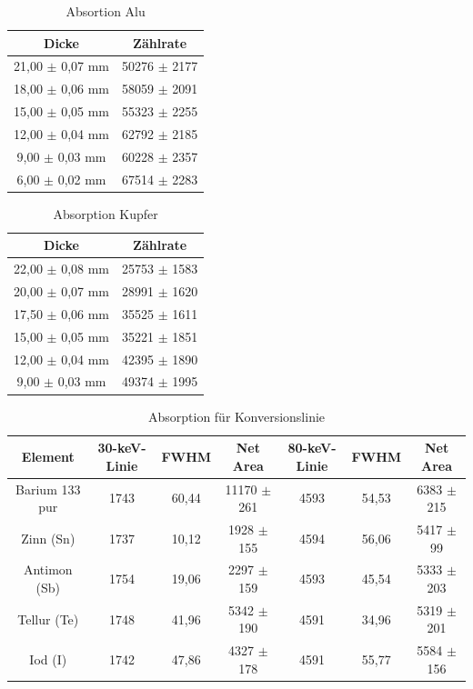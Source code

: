 \documentclass[
	parskip=half,10pt,
	numbers= noenddot, %
	toc=flat, %
	oneside,
	twocolumn,
	]{scrartcl}
\begin{document}
\begin{appendix}
\begin{table}[h]
\centering
\begin{tabular}{cc}
 Dicke & Zählrate \\
 \hline 
 21,00 $\pm$ 0,07 mm & 50276 $\pm$ 2177  \\
 18,00 $\pm$ 0,06 mm & 58059 $\pm$ 2091  \\
 15,00 $\pm$ 0,05 mm & 55323 $\pm$ 2255  \\
 12,00 $\pm$ 0,04 mm & 62792 $\pm$ 2185  \\
  9,00 $\pm$ 0,03 mm & 60228 $\pm$ 2357  \\
  6,00 $\pm$ 0,02 mm & 67514 $\pm$ 2283  \\
\end{tabular}
\caption{Absortion Alu}
\label{tab:abs_alu}
\end{table}

\begin{table}[h]
\centering
\begin{tabular}{cc}
 Dicke & Zählrate \\
 \hline
 22,00 $\pm$ 0,08 mm & 25753 $\pm$ 1583  \\
 20,00 $\pm$ 0,07 mm & 28991 $\pm$ 1620  \\
 17,50 $\pm$ 0,06 mm & 35525 $\pm$ 1611  \\
 15,00 $\pm$ 0,05 mm & 35221 $\pm$ 1851  \\
 12,00 $\pm$ 0,04 mm & 42395 $\pm$ 1890  \\
  9,00 $\pm$ 0,03 mm & 49374 $\pm$ 1995  \\
\end{tabular}
\caption{Absorption Kupfer}
\label{tab:abs_kupfer}
\end{table}
\end{appendix}

\begin{table}[h]
\begin{tabular}{ccccccc}
 Element & 30-keV-Linie & FWHM & Net Area & 80-keV-Linie & FWHM & Net Area \\
 \hline
 Barium 133 pur & 1743 & 60,44 & 11170 $\pm$ 261 & 4593 & 54,53 & 6383 $\pm$ 215 \\
 Zinn (Sn)      & 1737 & 10,12 &  1928 $\pm$ 155 & 4594 & 56,06 & 5417 $\pm$  99 \\
 Antimon (Sb)   & 1754 & 19,06 &  2297 $\pm$ 159 & 4593 & 45,54 & 5333 $\pm$ 203 \\
 Tellur (Te)    & 1748 & 41,96 &  5342 $\pm$ 190 & 4591 & 34,96 & 5319 $\pm$ 201 \\
 Iod (I)        & 1742 & 47,86 &  4327 $\pm$ 178 & 4591 & 55,77 & 5584 $\pm$ 156 \\
\end{tabular}
\caption{Absorption für Konversionslinie}
\label{tab:konversion}
\end{table}
\end{document}
